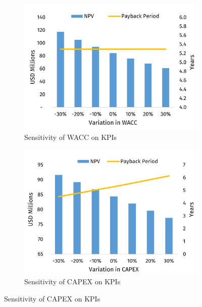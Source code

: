 \begin{figure}
\centering
\begin{subfigure}[b]{.45\linewidth}
\includegraphics[width=\linewidth]{chapters/6-economics/figures/Sensitivity_WACC.jpg}
\caption{Sensitivity of WACC on KPIs}\label{Sensitivity_WACC}
\end{subfigure}

\begin{subfigure}[b]{.45\linewidth}
\includegraphics[width=\linewidth]{chapters/6-economics/figures/Sensitivity_CAPEX.jpg}
\caption{Sensitivity of CAPEX on KPIs}\label{Sensitivity_CAPEX}
\end{subfigure}


\end{figure}

